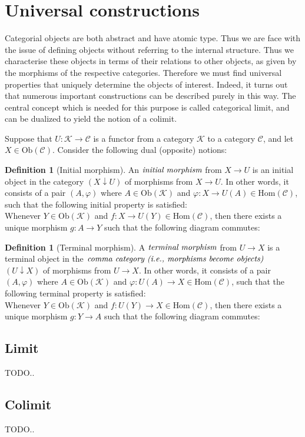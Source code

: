 \documentclass[10pt, oneside, reqno]{amsart}
\theoremstyle{plain}%
\theoremstyle{definition}
\newtheorem{defn}[thm]{Definition}
\theoremstyle{remark}
\begin{document}
\section{Universal constructions} %
\label{sec:universalconstructions}
Categorial objects are both abstract and have atomic type.
Thus we are face with the issue of defining objects without referring to the internal structure.
Thus we characterise these objects in terms of their relations to other objects, as given by the morphisms 
of the respective categories. Therefore we must find universal properties that uniquely determine the objects of interest.
Indeed, it turns out that numerous important constructions can be described purely in this way.
The central concept which is needed for this purpose is called categorical limit, and can be dualized to yield the notion of a colimit.

Suppose that $U: \mathcal{K} \to \mathcal{C}$ is a functor from a category $\mathcal{K}$ to a category $\mathcal{C}$,
and let $X \in \text{Ob}(\mathcal{C})$. Consider the following dual (opposite) notions:
\begin{defn}[Initial morphism]
 An $\emph{initial morphism}$ from $X \to U$ is an initial object in the category
 $(X \downarrow U)$ of morphisms from $X \to U$. In other words, it consists
 of a pair $(A, \varphi)$ where $A \in \text{Ob}(\mathcal{K})$ and $\varphi: X \to U(A) \in \text{Hom}(\mathcal{C})$,
 such that the following initial property is satisfied:
 \\
 Whenever $Y \in \text{Ob}(\mathcal{K})$ and $f: X \to U(Y) \in \text{Hom}(\mathcal{C})$, then there exists a unique morphism
 $g: A \to Y$ such that the following diagram commutes:
\end{defn}

\begin{defn}[Terminal morphism]
 A $\emph{terminal morphism}$ from $U \to X$ is a terminal object in the $\emph{comma category (i.e., morphisms become objects)}$
 $(U \downarrow X)$ of morphisms from $U \to X$. In other words, it consists of a pair $(A, \varphi)$
 where $A \in \text{Ob}(\mathcal{K})$ and $\varphi: U(A) \to X \in \text{Hom}(\mathcal{C})$,
 such that the following terminal property is satisfied:
 \\
 Whenever $Y \in \text{Ob}(\mathcal{K})$ and $f: U(Y) \to X \in \text{Hom}(\mathcal{C})$, then there exists a unique morphism
 $g: Y \to A$ such that the following diagram commutes:
\end{defn}


\subsection{Limit} %
\label{subsec:limit}
TODO..

\subsection{Colimit} %
\label{subsec:colimit}
TODO..
\end{document}
